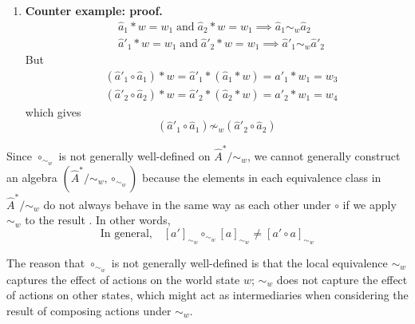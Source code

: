 \begin{proofE}
\begin{enumerate}[(1)]
    \item \textbf{Counter example: proof.}
    \begin{align}
        & \hat{a}_{1} \ast w = w_{1} \; \text{and} \; \hat{a}_{2} \ast w = w_{1} \implies \hat{a}_{1} \sim_{w} \hat{a}_{2} \\
        & \hat{a}'_{1} \ast w = w_{1} \; \text{and} \; \hat{a}'_{2} \ast w = w_{1} \implies \hat{a}'_{1} \sim_{w} \hat{a}'_{2}
    \end{align}
    But
    \begin{align}
        & (\hat{a}'_{1} \circ \hat{a}_{1}) \ast w = \hat{a}'_{1} \ast (\hat{a}_{1} \ast w) = \hat{a}'_{1} \ast w_{1} = w_{3} \\
        & (\hat{a}'_{2} \circ \hat{a}_{2}) \ast w = \hat{a}'_{2} \ast (\hat{a}_{2} \ast w) = \hat{a}'_{2} \ast w_{1} = w_{4}
    \end{align}
    which gives
    \begin{equation}
        (\hat{a}'_{1} \circ \hat{a}_{1}) \not\sim_{w} (\hat{a}'_{2} \circ \hat{a}_{2})
    \end{equation}
\end{enumerate}
\end{proofE}

Since $\circ_{\sim_{w}}$ is not generally well-defined on $\hat{A}^{*}/\sim_{w}$, we cannot generally construct an algebra $(\hat{A}^{*}/\sim_{w}, \circ_{\sim_{w}})$ because the elements in each equivalence class in $\hat{A}^{*}/\sim_{w}$ do not always behave in the same way as each other under $\circ$ if we apply $\sim_{w}$ to the result .
In other words,
\begin{equation}
    \text{In general,} \quad [a']_{\sim_{w}} \circ_{\sim_{w}} [a]_{\sim_{w}} \neq [a' \circ a]_{\sim_{w}}
\end{equation}

The reason that $\circ_{\sim_{w}}$ is not generally well-defined is that the local equivalence $\sim_{w}$ captures the effect of actions on the world state $w$; $\sim_{w}$ does not capture the effect of actions on other states, which might act as intermediaries when considering the result of composing actions under $\sim_{w}$.



